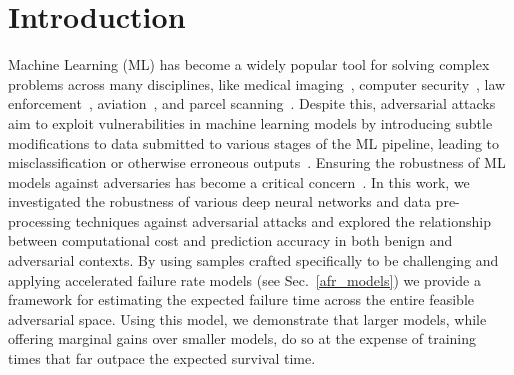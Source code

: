 \section{Introduction}

Machine Learning (ML) has become a widely popular tool for solving complex problems across many disciplines, like medical imaging~\cite{ai_medical_imaging}, computer security~\cite{ai_security}, law enforcement~\cite{ai_prison}, aviation~\cite{ai_aviation}, and parcel scanning~\cite{ai_luggage}. Despite this, adversarial attacks aim to exploit vulnerabilities in machine learning models by introducing subtle modifications to data submitted to various stages of the ML pipeline, leading to misclassification or otherwise erroneous outputs~\cite{chakraborty_adversarial_2018}. Ensuring the robustness of ML models against adversaries has become a critical concern~\cite{adversarialpatch,carlini_towards_2017,croce_reliable_2020,hopskipjump,art2018,meyers}. In this work, we investigated the robustness of various deep neural networks and data pre-processing techniques against adversarial attacks and explored the relationship between computational cost and  prediction accuracy in both benign and adversarial contexts.  By using samples crafted specifically to be challenging and applying accelerated failure rate models (see Sec.~\ref{afr_models}) we provide a framework for estimating the expected failure time across the entire feasible adversarial space. Using this model, we demonstrate that larger models, while offering marginal gains over smaller models, do so at the expense of training times that far outpace the expected survival time.


